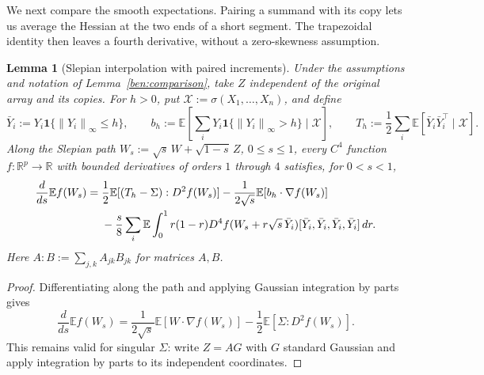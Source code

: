 \documentclass[11pt,letterpaper]{article}
\newenvironment{recovered}{\color{magenta}}{}
\newtheorem{lemma}{Lemma}
\theoremstyle{remark}
\newcommand{\E}{\mathbb E}
\newcommand{\R}{\mathbb R}
\newcommand{\norm}[1]{\left\lVert#1\right\rVert}
\newcommand{\ind}{\mathbf 1}
\begin{document}
\begin{recovered}
We next compare the smooth expectations. Pairing a summand with its
copy lets us average the Hessian at the two ends of a short segment.
The trapezoidal identity then leaves a fourth derivative, without a
zero-skewness assumption.

\begin{lemma}[Slepian interpolation with paired increments]
\label{ben:paired-interpolation}
Under the assumptions and notation of Lemma~\ref{ben:comparison},
take \(Z\) independent of the original array and its copies. For
\(h>0\), put \(\mathcal X:=\sigma(X_1,\ldots,X_n)\), and define
\[
 \bar Y_i:=Y_i\ind\{\norm{Y_i}_\infty\le h\},\qquad
 b_h:=\E\left[\sum_iY_i\ind\{\norm{Y_i}_\infty>h\}
                    \mid\mathcal X\right],\qquad
 T_h:=\frac12\sum_i\E[\bar Y_i\bar Y_i^\top\mid\mathcal X].
\]
Along the Slepian path
\(W_s:=\sqrt s\,W+\sqrt{1-s}\,Z\), \(0\le s\le1\),
every \(C^4\) function \(f:\R^p\to\R\) with bounded derivatives
of orders \(1\) through \(4\) satisfies, for \(0<s<1\),
\begin{align}
 \frac d{ds}\E f(W_s)
 ={}&\frac12\E[(T_h-\Sigma):D^2f(W_s)]
       -\frac1{2\sqrt s}\E[b_h\cdot\nabla f(W_s)]\notag\\
 &-\frac{s}{8}\sum_i\E\int_0^1 r(1-r)
 D^4f(W_s+r\sqrt s\,\bar Y_i)
          [\bar Y_i,\bar Y_i,\bar Y_i,\bar Y_i]\,dr.
 \label{ben:slepian-identity}
\end{align}
Here \(A:B:=\sum_{j,k}A_{jk}B_{jk}\) for matrices \(A,B\).
\end{lemma}
\begin{proof}
Differentiating along the path and applying Gaussian integration by
parts gives
\begin{equation}\label{ben:slepian-initial}
 \frac d{ds}\E f(W_s)
 =\frac1{2\sqrt s}\E[W\cdot\nabla f(W_s)]
       -\frac12\E[\Sigma:D^2f(W_s)].
\end{equation}
This remains valid for singular \(\Sigma\): write \(Z=AG\) with
\(G\) standard Gaussian and apply integration by parts to its
independent coordinates.


\end{proof}
\end{recovered}
\end{document}
